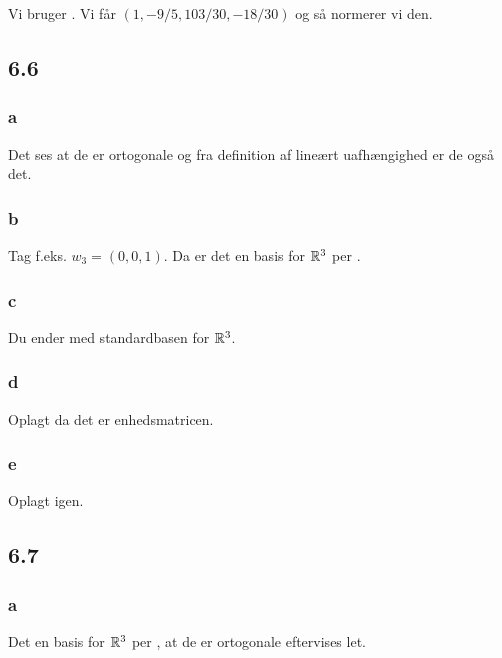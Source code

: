 			Vi bruger \cite[Eksempel 6.2.12]{hesselholt2017}. Vi får $(1,-9/5,103/30,-18/30)$ og så normerer vi den.

		\subsection{6.6}

			\subsubsection{a}

				Det ses at de er ortogonale og fra definition af lineært uafhængighed \cite[Definition 4.3.4]{hesselholt2017} er de også det.

			\subsubsection{b}

				Tag f.eks. $w_3=(0,0,1)$. Da er det en basis for $\mathbb{R}^3$ per \cite[Lemma 4.3.9]{hesselholt2017}.

			\subsubsection{c}

				Du ender med standardbasen for $\mathbb{R}^3$.

			\subsubsection{d}

				Oplagt da det er enhedsmatricen.

			\subsubsection{e}

				Oplagt igen.

		\subsection{6.7}

			\subsubsection{a}

				Det en basis for $\mathbb{R}^3$ per \cite[Lemma 4.3.9]{hesselholt2017}, at de er ortogonale eftervises let.

